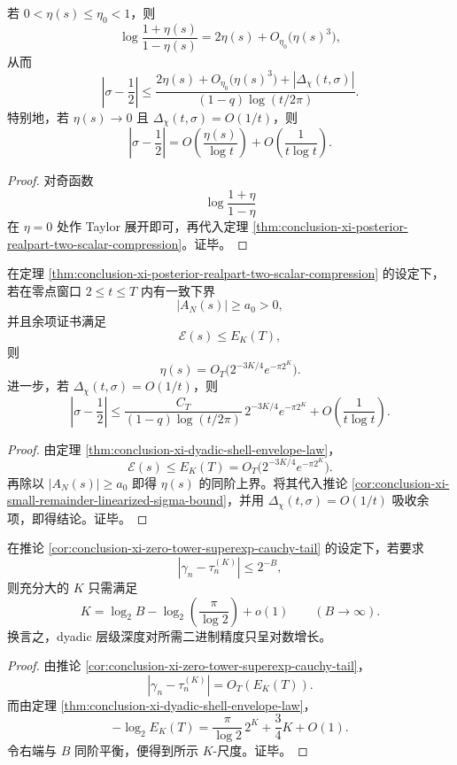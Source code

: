 \begin{corollary}[小余项制度下的线性化偏移界]\label{cor:conclusion-xi-small-remainder-linearized-sigma-bound}
若 \(0<\eta(s)\le \eta_0<1\)，则
\[
\log\frac{1+\eta(s)}{1-\eta(s)}
=
2\eta(s)+O_{\eta_0}\!\bigl(\eta(s)^3\bigr),
\]
从而
\[
\left|\sigma-\frac12\right|
\le
\frac{
2\eta(s)+O_{\eta_0}\!\bigl(\eta(s)^3\bigr)+|\Delta_\chi(t,\sigma)|
}{
(1-q)\log(t/2\pi)
}.
\]
特别地，若 \(\eta(s)\to0\) 且 \(\Delta_\chi(t,\sigma)=O(1/t)\)，则
\[
\left|\sigma-\frac12\right|
=
O\!\left(\frac{\eta(s)}{\log t}\right)+O\!\left(\frac{1}{t\log t}\right).
\]
\end{corollary}
\begin{proof}
对奇函数
\[
\log\frac{1+\eta}{1-\eta}
\]
在 \(\eta=0\) 处作 Taylor 展开即可，再代入定理 \ref{thm:conclusion-xi-posterior-realpart-two-scalar-compression}。证毕。
\end{proof}

\begin{theorem}\label{thm:conclusion-xi-dyadic-budget-vertical-superexp-contraction}
在定理 \ref{thm:conclusion-xi-posterior-realpart-two-scalar-compression} 的设定下，若在零点窗口 \(2\le t\le T\) 内有一致下界
\[
|A_N(s)|\ge a_0>0,
\]
并且余项证书满足
\[
\mathcal E(s)\le E_K(T),
\]
则
\[
\eta(s)=O_T\!\bigl(2^{-3K/4}e^{-\pi 2^K}\bigr).
\]
进一步，若 \(\Delta_\chi(t,\sigma)=O(1/t)\)，则
\[
\left|\sigma-\frac12\right|
\le
\frac{C_T}{(1-q)\log(t/2\pi)}\,2^{-3K/4}e^{-\pi 2^K}
+
O\!\left(\frac{1}{t\log t}\right).
\]
\end{theorem}
\begin{proof}
由定理 \ref{thm:conclusion-xi-dyadic-shell-envelope-law}，
\[
\mathcal E(s)\le E_K(T)=O_T\!\bigl(2^{-3K/4}e^{-\pi 2^K}\bigr).
\]
再除以 \(|A_N(s)|\ge a_0\) 即得 \(\eta(s)\) 的同阶上界。将其代入推论 \ref{cor:conclusion-xi-small-remainder-linearized-sigma-bound}，并用 \(\Delta_\chi(t,\sigma)=O(1/t)\) 吸收余项，即得结论。证毕。
\end{proof}

\begin{corollary}[零点认证的比特复杂度只呈对数增长]\label{cor:conclusion-xi-zero-certification-logarithmic-depth}
在推论 \ref{cor:conclusion-xi-zero-tower-superexp-cauchy-tail} 的设定下，若要求
\[
|\gamma_n-\tau_n^{(K)}|\le 2^{-B},
\]
则充分大的 \(K\) 只需满足
\[
K=\log_2 B-\log_2\!\left(\frac{\pi}{\log 2}\right)+o(1)
\qquad (B\to\infty).
\]
换言之，dyadic 层级深度对所需二进制精度只呈对数增长。
\end{corollary}
\begin{proof}
由推论 \ref{cor:conclusion-xi-zero-tower-superexp-cauchy-tail}，
\[
|\gamma_n-\tau_n^{(K)}|=O_T(E_K(T)).
\]
而由定理 \ref{thm:conclusion-xi-dyadic-shell-envelope-law}，
\[
-\log_2 E_K(T)
=
\frac{\pi}{\log2}\,2^K+\frac34K+O(1).
\]
令右端与 \(B\) 同阶平衡，便得到所示 \(K\)-尺度。证毕。
\end{proof}

